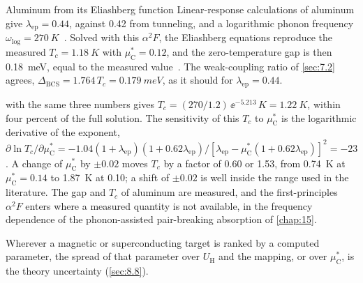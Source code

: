 \begin{workedexample}{Aluminum from its Eliashberg function}\label{we:E-al}
Linear-response calculations of aluminum give $\lambda_{\mathrm{ep}} = 0.44$, against 0.42 from tunneling, and a logarithmic phonon frequency $\omega_{\log} = \SI{270}{K}$~\cite[Tables~II and~III]{savrasov1996electron}. Solved with this $\alpha^2F$, the Eliashberg equations reproduce the measured $T_c = \SI{1.18}{K}$ with $\mu^*_{\mathrm{C}} = 0.12$, and the zero-temperature gap is then \SI{0.18}{meV}, equal to the measured value~\cite[Table~III]{savrasov1996electron}. The weak-coupling ratio of \cref{sec:7.2} agrees, $\Delta_{\mathrm{BCS}} = 1.764\,T_c = \SI{0.179}{meV}$, as it should for $\lambda_{\mathrm{ep}} = 0.44$.

 with the same three numbers gives $T_c = (270/1.2)\,\ee^{-5.213}\,\si{K} = \SI{1.22}{K}$, within four percent of the full solution. The sensitivity of this $T_c$ to $\mu^*_{\mathrm{C}}$ is the logarithmic derivative of the exponent, $\partial\ln T_c/\partial\mu^*_{\mathrm{C}} = -1.04(1 + \lambda_{\mathrm{ep}})(1 + 0.62\lambda_{\mathrm{ep}})/[\lambda_{\mathrm{ep}} - \mu^*_{\mathrm{C}}(1 + 0.62\lambda_{\mathrm{ep}})]^2 = -23$. A change of $\mu^*_{\mathrm{C}}$ by $\pm0.02$ moves $T_c$ by a factor of 0.60 or 1.53, from \SI{0.74}{K} at $\mu^*_{\mathrm{C}} = 0.14$ to \SI{1.87}{K} at 0.10; a shift of $\pm0.02$ is well inside the range used in the literature. The gap and $T_c$ of aluminum are measured, and the first-principles $\alpha^2F$ enters where a measured quantity is not available, in the frequency dependence of the phonon-assisted pair-breaking absorption of \cref{chap:15}.
\end{workedexample}

Wherever a magnetic or superconducting target is ranked by a computed parameter, the spread of that parameter over $U_{\mathrm{H}}$ and the mapping, or over $\mu^*_{\mathrm{C}}$, is the theory uncertainty (\cref{sec:8.8}).
